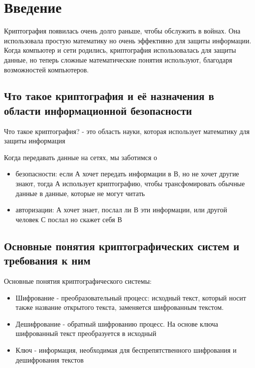 \section{Введение}
Криптография появилась очень долго раньше, чтобы обслужить в войнах. Она использовала простую математику но очень эффективно для защиты информации. Когда компьютер и сети родились, криптография использовалась для защиты данные, но теперь сложные математические понятия используют, благодаря возможностей компьютеров.

\subsection{Что такое криптография и её назначения в области информационной безопасности}

	Что такое криптография? - это область науки, которая использует математику для защиты информация

Когда передавать данные на сетях, мы заботимся о

\begin{itemize}[label={--},noitemsep,nolistsep]
    \item безопасности: если А хочет передать информации в В, но не хочет другие знают, тогда А использует криптографию, чтобы трансфомировать обычные данные в данные, которые не могут читать
    \item авторизации: А хочет знает, послал ли В эти информации, или другой человек С послал но скажет себя В
\end{itemize}
\subsection{Основные понятия криптографических систем и требования к ним}
    
Основные понятия криптографического системы: \cite{lecturesOIB}

\begin{itemize}[noitemsep,nolistsep,label={--}]
	\item Шифрование - преобразовательный процесс: исходный текст, который носит также название открытого текста, заменяется шифрованным текстом. 
	\item Дешифрование - обратный шифрованию процесс. На основе ключа шифрованный текст преобразуется в исходный
	\item Ключ - информация, необходимая для беспрепятственного шифрования и дешифрования текстов
\end{itemize}

